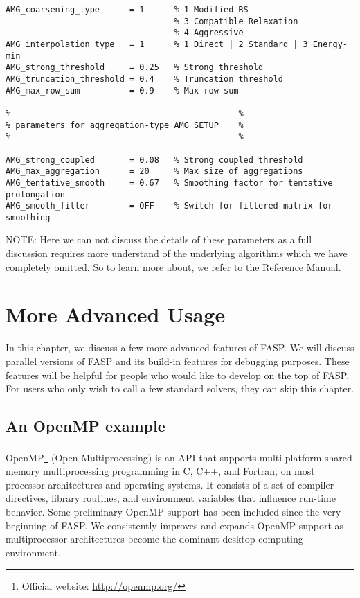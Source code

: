 \documentclass[11pt]{memoir}
\begin{document}
\begin{lstlisting}
AMG_coarsening_type      = 1      % 1 Modified RS
                                  % 3 Compatible Relaxation
                                  % 4 Aggressive
AMG_interpolation_type   = 1      % 1 Direct | 2 Standard | 3 Energy-min
AMG_strong_threshold     = 0.25   % Strong threshold
AMG_truncation_threshold = 0.4    % Truncation threshold
AMG_max_row_sum          = 0.9    % Max row sum

%----------------------------------------------%
% parameters for aggregation-type AMG SETUP    %
%----------------------------------------------%

AMG_strong_coupled       = 0.08   % Strong coupled threshold
AMG_max_aggregation      = 20     % Max size of aggregations
AMG_tentative_smooth     = 0.67   % Smoothing factor for tentative prolongation
AMG_smooth_filter        = OFF    % Switch for filtered matrix for smoothing
\end{lstlisting}

\begin{snugshade}\noindent
NOTE: Here we can not discuss the details of these parameters as a full discussion requires more understand of the underlying algorithms which we have completely omitted. So to learn more about, we refer to the Reference Manual.
\end{snugshade}

\chapter{More Advanced Usage}\label{ch:advanced}

In this chapter, we discuss a few more advanced features of FASP. We will discuss parallel versions of FASP and its build-in features for debugging purposes. These features will be helpful for people who would like to develop on the top of FASP. For users who only wish to call a few standard solvers, they can skip this chapter.

\section{An OpenMP example}\label{sec:mop}

OpenMP\footnote{Official website: \url{http://openmp.org/}} (Open Multiprocessing) is an API that supports multi-platform shared memory multiprocessing programming in C, C++, and Fortran, on most processor architectures and operating systems. It consists of a set of compiler directives, library routines, and environment variables that influence run-time behavior. Some preliminary OpenMP support has been included since the very beginning of FASP. We consistently improves and expands OpenMP support as multiprocessor architectures become the dominant desktop computing environment.
\end{document}
